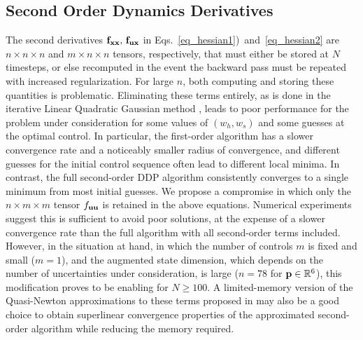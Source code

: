 
\subsection{Second Order Dynamics Derivatives}\label{Sec:DDP_Simplification}
The second derivatives $\mathbf{f}_{\mathbf{x}\mathbf{x}},\, \mathbf{f}_{\mathbf{u}\mathbf{x}}$ in Eqs.~\eqref{eq_hessian1})~and~\eqref{eq_hessian2} are $n\times n\times n$ and $m\times n\times n$ tensors, respectively, that must either be stored at $N$ timesteps, or else recomputed in the event the backward pass must be repeated with increased regularization. For large $n$, both computing and storing these quantities is problematic. Eliminating these terms entirely, as is done in the iterative Linear Quadratic Gaussian method \cite{iLQG}, leads to poor performance for the problem under consideration for some values of $(w_h,w_s)$ and some guesses at the optimal control. In particular, the first-order algorithm has a slower convergence rate and a noticeably smaller radius of convergence, and different guesses for the initial control sequence often lead to different local minima. In contrast, the full second-order DDP algorithm consistently converges to a single minimum from most initial guesses. We propose a compromise in which only the $n\times m \times m$ tensor $f_{\mathbf{u}\mathbf{u}}$ is retained in the above equations. Numerical experiments suggest this is sufficient to avoid poor solutions, at the expense of a slower convergence rate than the full algorithm with all second-order terms included. However, in the situation at hand, in which the number of controls $m$ is fixed and small ($ m=1 $), and the augmented state dimension, which depends on the number of uncertainties under consideration, is large ($n=78$ for $\mathbf{p}\in\mathbb{R}^6$), this modification proves to be enabling for $N\geq 100$. A limited-memory version of the Quasi-Newton approximations to these terms proposed in \cite{QNDDP} may also be a good choice to obtain superlinear convergence properties of the approximated second-order algorithm while reducing the memory required. 

